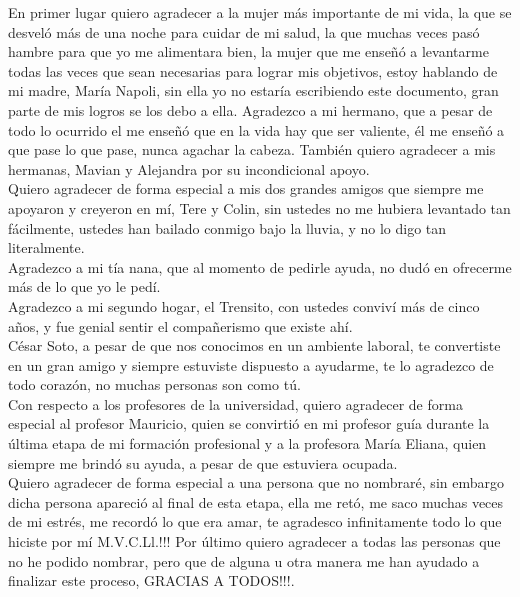 En primer lugar quiero agradecer a la mujer más importante de mi  vida,  la que se desveló más de una noche  para cuidar de mi salud, la que muchas veces pasó hambre para que yo me alimentara bien, la mujer que me enseñó a levantarme todas las veces que sean necesarias para lograr mis objetivos, estoy hablando de mi madre, María Napoli, sin ella yo no  estaría escribiendo este documento, gran parte de mis logros se los debo a ella. Agradezco a mi hermano,  que a pesar de todo lo ocurrido el me enseñó que en la vida hay que ser valiente, él me enseñó a que pase lo que pase, nunca agachar la cabeza. También quiero agradecer a mis hermanas, Mavian y Alejandra por su incondicional apoyo.
\\

Quiero agradecer de forma especial a mis dos grandes amigos que siempre me apoyaron y creyeron en mí, Tere y Colin, sin ustedes  no me hubiera levantado tan fácilmente, ustedes han  bailado conmigo bajo la lluvia, y no lo digo tan literalmente.\\

Agradezco a mi tía nana, que al momento de pedirle ayuda, no dudó en ofrecerme más de lo que yo le pedí.\\
Agradezco a mi segundo hogar, el Trensito,  con ustedes conviví más de cinco años, y fue genial sentir el compañerismo que existe ahí.
\\

César Soto, a pesar de que nos conocimos en un ambiente laboral, te convertiste en un gran amigo y siempre estuviste dispuesto a ayudarme, te lo agradezco de todo corazón, no muchas personas son como tú.\\


Con respecto a los profesores de la universidad, quiero agradecer de forma especial al profesor Mauricio, quien se convirtió en mi profesor guía durante la última etapa de mi formación profesional y a la profesora María Eliana, quien siempre me brindó su ayuda, a pesar de que estuviera ocupada.\\

Quiero agradecer de forma especial a una persona que no nombraré, sin embargo dicha persona apareció al final de esta etapa, ella me retó, me saco muchas veces de mi estrés, me recordó lo que era amar, te agradesco infinitamente todo lo que hiciste por mí M.V.C.Ll.!!! 
Por último quiero agradecer a todas las personas que no he podido nombrar, pero que de alguna u otra  manera me han ayudado  a finalizar este proceso, GRACIAS A TODOS!!!.


 
 
 
 
 